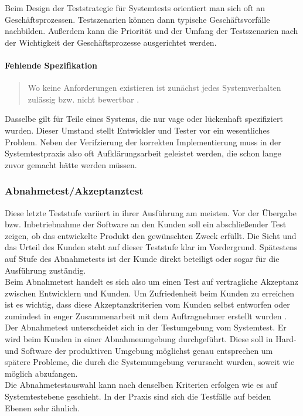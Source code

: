 Beim Design der Teststrategie für Systemtests orientiert man sich oft an Geschäftsprozessen. Testszenarien können dann typische Geschäftsvorfälle nachbilden. Außerdem kann die Priorität und  der Umfang der Testszenarien nach der Wichtigkeit der Geschäftsprozesse ausgerichtet werden.

\paragraph{Fehlende Spezifikation}

\begin{quote}
Wo keine Anforderungen existieren ist zunächst jedes Systemverhalten zulässig bzw. nicht bewertbar \cite{spillner_basiswissen_2012}.
\end{quote}
Dasselbe gilt für Teile eines Systems, die nur vage oder lückenhaft spezifiziert wurden. Dieser Umstand stellt Entwickler und Tester vor ein wesentliches Problem. Neben der Verifzierung der korrekten Implementierung muss in der Systemtestpraxis also oft Aufklärungsarbeit geleistet werden, die schon lange zuvor gemacht hätte werden müssen.

\subsubsection{Abnahmetest/Akzeptanztest}
Diese letzte Teststufe variiert in ihrer Ausführung am meisten. Vor der Übergabe bzw. Inbetriebnahme der Software an den Kunden soll ein abschließender Test zeigen, ob das entwickelte Produkt den gewünschten Zweck erfüllt. Die Sicht und das Urteil des Kunden steht auf dieser Teststufe klar im Vordergrund. Spätestens auf Stufe des Abnahmetests ist der Kunde direkt beteiligt oder sogar für die Ausführung zuständig.\\
Beim Abnahmetest handelt es sich also um einen Test auf vertragliche Akzeptanz zwischen Entwicklern und Kunden. Um Zufriedenheit beim Kunden zu erreichen ist es wichtig, dass diese Akzeptanzkriterien vom Kunden selbst entworfen oder zumindest in enger Zusammenarbeit mit dem Auftragnehmer erstellt wurden \cite{spillner_basiswissen_2012}. Der Abnahmetest unterscheidet sich in der Testumgebung vom Systemtest. Er wird beim Kunden in einer Abnahmeumgebung durchgeführt. Diese soll in Hard- und Software der produktiven Umgebung möglichst genau entsprechen um spätere Probleme, die durch die Systemumgebung verursacht wurden, soweit wie möglich abzufangen.\\
Die Abnahmetestauswahl kann nach denselben Kriterien erfolgen wie es auf Systemtestebene geschieht. In der Praxis sind sich die Testfälle auf beiden Ebenen sehr ähnlich.

